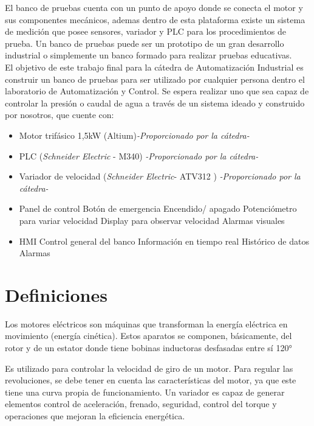 El banco de pruebas cuenta con un punto de apoyo donde se conecta el motor y sus componentes mecánicos, ademas dentro de esta plataforma existe un sistema de medición que posee sensores, variador y PLC para los procedimientos de prueba.
Un banco de pruebas puede ser un prototipo de un gran desarrollo industrial o simplemente un banco formado para realizar pruebas educativas. \\

El objetivo de este trabajo final para la cátedra de Automatización Industrial es construir un banco de pruebas para ser utilizado por cualquier persona dentro el laboratorio de Automatización y Control. Se espera realizar uno que sea capaz de controlar la presión o caudal de agua a través de un sistema ideado y construido por nosotros, que cuente con:
\begin{itemize}
    \item Motor trifásico 1,5kW (Altium)\textit{-Proporcionado por la cátedra-}
    \item PLC (\textit{Schneider Electric} - M340) \textit{-Proporcionado por la cátedra-}
    \item Variador de velocidad (\textit{Schneider Electric}- ATV312 ) \textit{-Proporcionado por la cátedra-}
    \item Panel de control
        \subitem Botón de emergencia
        \subitem Encendido/ apagado
        \subitem Potenciómetro para variar velocidad
        \subitem Display para observar velocidad
        \subitem Alarmas visuales
    \item HMI
        \subitem Control general del banco
        \subitem Información en tiempo real
        \subitem Histórico de datos
        \subitem Alarmas
\end{itemize}


\newpage

\section{Definiciones}
\begin{tcolorbox}[colback=blue!5!white,colframe=blue!75!black,title=Motor eléctrico]
	Los motores eléctricos son máquinas que transforman la energía eléctrica en movimiento (energía cinética). Estos aparatos se componen, básicamente, del rotor y de un estator donde tiene bobinas inductoras desfasadas entre sí 120°
\end{tcolorbox}

\begin{tcolorbox}[colback=blue!5!white,colframe=blue!75!black,title=Variador de velocidad]
	Es utilizado para controlar la velocidad de giro de un motor.
	Para regular las revoluciones, se debe tener en cuenta las características del motor, ya que este tiene una curva propia de funcionamiento. Un variador es capaz de generar elementos control de aceleración, frenado, seguridad, control del torque y operaciones que mejoran la eficiencia energética.
\end{tcolorbox}

